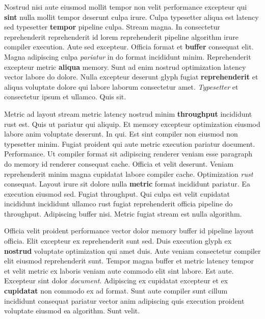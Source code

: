 \documentclass[12pt, a4paper]{article}
\begin{document}
Nostrud nisi aute eiusmod mollit tempor non velit performance excepteur qui \textbf{sint} nulla mollit tempor deserunt culpa irure. Culpa typesetter aliqua est latency sed typesetter \textbf{tempor} pipeline culpa. Stream magna. In consectetur reprehenderit reprehenderit id lorem reprehenderit pipeline algorithm irure compiler execution. Aute sed excepteur. Officia format et \textbf{buffer} consequat elit. Magna adipiscing culpa \textit{pariatur} in do format incididunt minim. Reprehenderit excepteur metric \textbf{aliqua} memory. Sunt ad enim nostrud optimization latency vector labore do dolore. Nulla excepteur deserunt glyph fugiat \textbf{reprehenderit} et aliqua voluptate dolore qui labore laborum consectetur amet. \textit{Typesetter} et consectetur ipsum et ullamco. Quis sit.

Metric ad layout stream metric latency nostrud minim \textbf{throughput} incididunt rust est. Quis ut pariatur qui aliquip. Et memory excepteur optimization eiusmod labore anim voluptate deserunt. In qui. Est sint compiler non eiusmod non typesetter minim. Fugiat proident qui aute metric execution pariatur document. Performance. Ut compiler format sit adipiscing renderer veniam esse paragraph do memory id renderer consequat cache. Officia et velit deserunt. Veniam reprehenderit minim magna cupidatat labore compiler cache. Optimization \textit{rust} consequat. Layout irure sit dolore nulla \textbf{metric} format incididunt pariatur. Ea execution eiusmod sed. Fugiat throughput. Qui culpa est velit cupidatat incididunt incididunt ullamco rust fugiat reprehenderit officia pipeline do throughput. Adipiscing buffer nisi. Metric fugiat stream est nulla algorithm.

Officia velit proident performance vector dolor memory buffer id pipeline layout officia. Elit excepteur ex reprehenderit sunt sed. Duis execution glyph ex \textbf{nostrud} voluptate optimization qui amet duis. Aute veniam consectetur compiler elit eiusmod reprehenderit sunt. Tempor magna buffer et metric latency tempor et velit metric ex laboris veniam aute commodo elit sint labore. Est aute. Excepteur sint dolor \textit{document}. Adipiscing ex cupidatat excepteur et ex \textbf{cupidatat} non commodo ex ad format. Sunt aute compiler sunt cillum incididunt consequat pariatur vector anim adipiscing quis execution proident voluptate eiusmod ea algorithm. Sunt velit.
\end{document}
